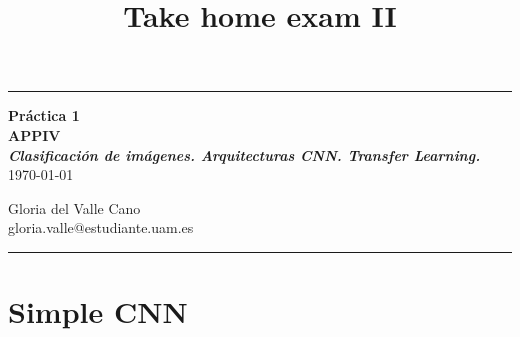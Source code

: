 \documentclass[12pt]{scrartcl}
\title{Take home exam II}
\begin{document}
\begin{center}
	\hrule
	\vspace{.4cm}
	{\textbf { \large \textbf{Práctica 1} \\ APPIV \\ \vspace{1em} \small \textit{Clasificación de imágenes. Arquitecturas CNN. Transfer Learning.}} \\ \vspace{0.5em}\today}
\end{center}

\begin{center}
{ \vspace{0.5em} Gloria del Valle Cano \hspace{\fill}   \\}
{ gloria.valle@estudiante.uam.es \hspace{\fill} \\ \vspace{1.5em}}
	\hrule
\end{center}



\section{Simple CNN}
\end{document}
